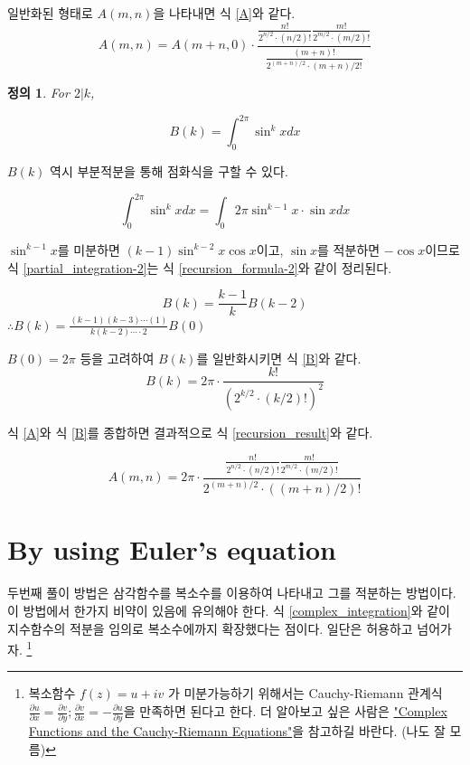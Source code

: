 \documentclass[11pt]{article}
\newtheorem{definition}{정의}
\begin{document}
일반화된 형태로 $A(m,n)$을 나타내면 식 \ref{A}와 같다.
\begin{equation} \label{A}
A(m,n)=A(m+n,0)\cdot\frac{\frac{n!}{2^{n/2}\cdot(n/2)!}\frac{m!}{2^{m/2}\cdot(m/2)!}}{\frac{(m+n)!}{2^{(m+n)/2}\cdot{(m+n)/2}!}}
\end{equation}

\begin{definition}
	For $2|k$,
	
	$$B(k)=\int_{0}^{2\pi}{\sin^k xdx}$$
\end{definition}

$B(k)$ 역시  부분적분을 통해 점화식을 구할 수 있다. 

\begin{equation} \label{partial_integration-2}
\int_{0}^{2\pi}{\sin^k xdx} = \int_{0}{2\pi}{\sin^{k-1}x \cdot \sin x dx}
\end{equation}

$\sin^{k-1}{x}$를 미분하면 $(k-1)\sin^{k-2}{x}\cos{x}$이고,
$\sin{x}$를 적분하면 $-\cos{x}$이므로
식 \ref{partial_integration-2}는 식 \ref{recursion_formula-2}와 같이 정리된다.

\begin{equation} \label{recursion_formula-2}
B(k)=\frac{k-1}{k}B(k-2)
\end{equation}
$\therefore B(k)=\frac{(k-1)(k-3)\cdots(1)}{k(k-2)\cdots\cdot2}B(0)$

$B(0)=2\pi$ 등을 고려하여 $B(k)$를 일반화시키면 식 \ref{B}와 같다.
\begin{equation} \label{B}
B(k)=2\pi \cdot \frac{k!}{(2^{k/2}\cdot(k/2)!)^2}
\end{equation}

식 \ref{A}와 식 \ref{B}를 종합하면 결과적으로 식 \ref{recursion_result}와 같다.

\begin{equation} \label{recursion_result}
A(m,n)=2\pi \cdot \frac{\frac{n!}{2^{n/2}\cdot(n/2)!}\frac{m!}{2^{m/2}\cdot(m/2)!}}{2^{(m+n)/2}\cdot((m+n)/2)!}
\end{equation}


\section{By using Euler's equation} \label{complex}
두번째 풀이 방법은 삼각함수를 복소수를 이용하여 나타내고 그를 적분하는 방법이다. 이 방법에서 한가지 비약이 있음에 유의해야 한다. 식 \ref{complex_integration}와 같이 지수함수의 적분을 임의로 복소수에까지 확장했다는 점이다. 일단은 허용하고 넘어가자.
\footnote{복소함수 $f(z)=u+iv$ 가 미분가능하기 위해서는 Cauchy-Riemann 관계식 
$\frac{\partial u}{\partial x} = \frac{\partial v}{\partial y};
 \frac{\partial v}{\partial x} = -\frac{\partial u}{\partial y}
$을 만족하면 된다고 한다. 더 알아보고 싶은 사람은
\href{http://www.math.columbia.edu/~rf/complex2.pdf}{"Complex Functions and the Cauchy-Riemann Equations"}을 참고하길 바란다. (나도 잘 모름)
}
\end{document}
